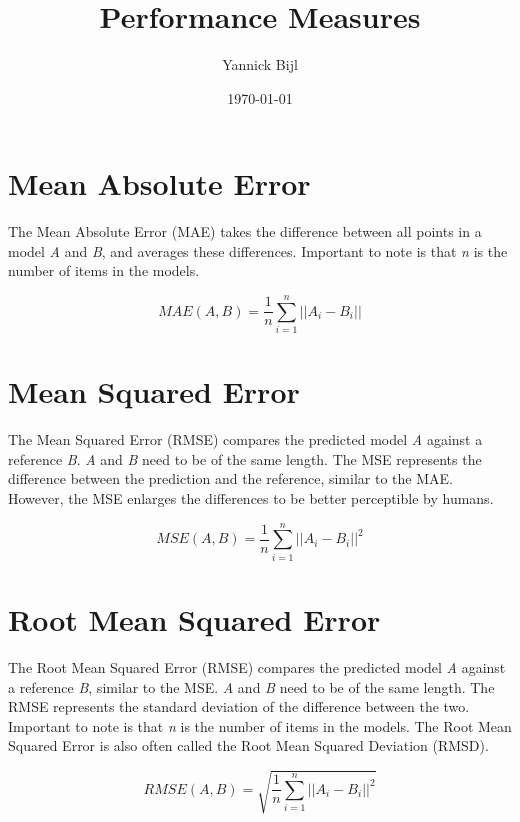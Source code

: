 \documentclass{article}
\title{Performance Measures}
\author{Yannick Bijl}
\date{\today}
\begin{document}
\maketitle

\tableofcontents
\newpage

\section{Mean Absolute Error}
The Mean Absolute Error (MAE) takes the difference between all points in a model \textit{A} and \textit{B}, and averages these differences. Important to note is that \textit{n} is the number of items in the models.

\begin{equation}
    \label{eq:mse}
    MAE(A, B) = \frac{1}{n} \sum_{i=1}^{n} ||A_i - B_i||
\end{equation}


\section{Mean Squared Error}
The Mean Squared Error (RMSE) compares the predicted model \textit{A} against a reference \textit{B}. \textit{A} and \textit{B} need to be of the same length. The MSE represents the difference between the prediction and the reference, similar to the MAE. However, the MSE enlarges the differences to be better perceptible by humans. 

\begin{equation}
    \label{eq:mse}
    MSE(A, B) = \frac{1}{n} \sum_{i=1}^{n} ||A_i - B_i||^2
\end{equation}

\section{Root Mean Squared Error}
The Root Mean Squared Error (RMSE) compares the predicted model \textit{A} against a reference \textit{B}, similar to the MSE. \textit{A} and \textit{B} need to be of the same length. The RMSE represents the standard deviation of the difference between the two. Important to note is that \textit{n} is the number of items in the models. The Root Mean Squared Error is also often called the Root Mean Squared Deviation (RMSD).

\begin{equation}
    \label{eq:rmse}
    RMSE(A, B) = \sqrt{\frac{1}{n} \sum_{i=1}^{n} ||A_i - B_i||^2}
\end{equation}
\end{document}
